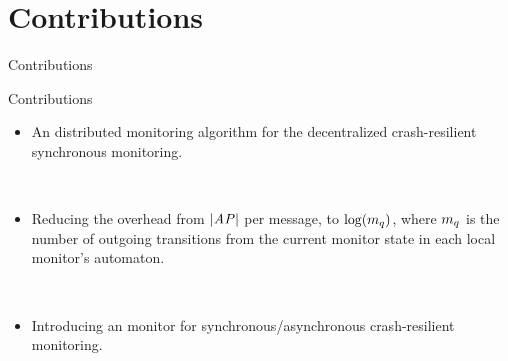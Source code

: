 \section{Contributions}
\begin{frame}{Contributions}

\begin{block}{Contributions}
\begin{itemize}

\item An  distributed \LTL monitoring algorithm for the decentralized crash-resilient synchronous monitoring.

\ \\

\item Reducing the  overhead from $|\mathit{AP}|$ per message, to $\log(m_q)$, where $m_q$ is the number of outgoing transitions from the current monitor state in each local monitor's automaton. 

\ \\

\item Introducing an  monitor for synchronous/asynchronous crash-resilient monitoring.


\end{itemize}
\end{block}
\end{frame}

